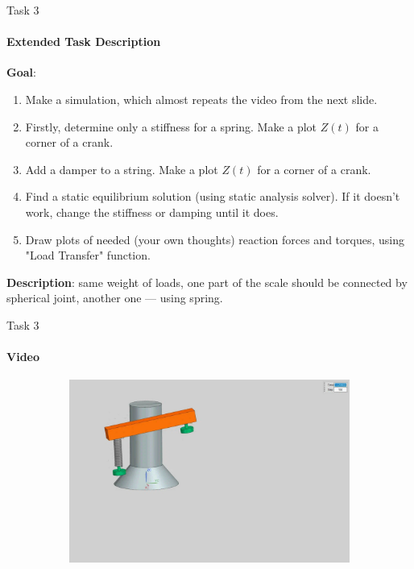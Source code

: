 \documentclass[aspectratio=169]{beamer}
\begin{document}
\begin{frame}[t]{Task 3}
    \framesubtitle{Extended Task Description}
    \vspace{-0.5cm}
    \textbf{Goal}: \begin{enumerate}
        \item Make a simulation, which almost repeats the video from the next slide.
        \item Firstly, determine only a stiffness for a spring. Make a plot $Z(t)$ for a corner of a crank.
        \item Add a damper to a string. Make a plot $Z(t)$ for a corner of a crank.
        \item Find a static equilibrium solution (using static analysis solver). If it doesn't work, change the stiffness or damping until it does.
        \item Draw plots of needed (your own thoughts) reaction forces and torques, using "Load Transfer" function.
    \end{enumerate}
    
    
    \smallskip

    \textbf{Description}: same weight of loads, one part of the scale should be connected by spherical joint, another one --- using spring.  
\end{frame}

\begin{frame}[t]{Task 3}
    \framesubtitle{Video}
    \vspace{-0.6cm}
    \begin{figure}[H]
        \href{https://disk.yandex.ru/i/Hw4DpScaAzPctg}{
            \centering\includegraphics[height=6cm,width=1\textwidth,keepaspectratio]{3_preview.png}}
        \label{fig:3_preview.png}
    \end{figure}
\end{frame}
\end{document}
